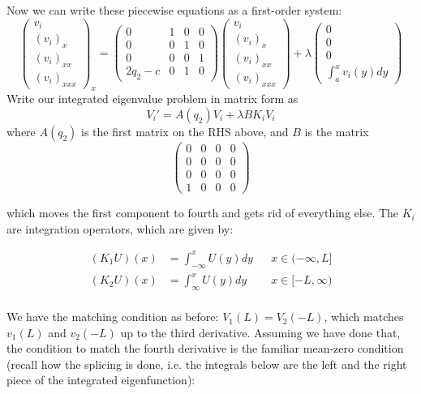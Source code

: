 \documentclass[12pt]{article}
\begin{document}
Now we can write these piecewise equations as a first-order system:
\[
\begin{pmatrix}v_i\\(v_i)_x\\(v_i)_{xx}\\(v_i)_{xxx}\end{pmatrix}_x = 
\begin{pmatrix}0 & 1 & 0 & 0 \\ 0 & 0 & 1 & 0 \\ 0 & 0 & 0 & 1 \\ 2q_2 - c & 0 & 1 & 0\end{pmatrix}
\begin{pmatrix}v_i\\(v_i)_x\\(v_i)_{xx}\\(v_i)_{xxx}\end{pmatrix} + \lambda
\begin{pmatrix}0\\0\\0\\\int_{a}^x v_i(y) dy\end{pmatrix}
\]
Write our integrated eigenvalue problem in matrix form as
\[
V_i' = A(q_2) V_i + \lambda B K_i V_i
\]
where $A(q_2)$ is the first matrix on the RHS above, and $B$ is the matrix
\[
\begin{pmatrix}0 & 0 & 0 & 0 \\0 & 0 & 0 & 0 \\0 & 0 & 0 & 0 \\1 & 0 & 0 & 0 \end{pmatrix}
\]

which moves the first component to fourth and gets rid of everything else. The $K_i$ are integration operators, which are given by:

\begin{align*}
(K_1 U)(x) &= \int_{-\infty}^x U(y) dy && x \in (-\infty, L] \\
(K_2 U)(x) &= \int_{\infty}^x U(y) dy && x \in [-L, \infty) \\
\end{align*}

We have the matching condition as before: $V_1(L) = V_2(-L)$, which matches $v_1(L)$ and $v_2(-L)$ up to the third derivative. Assuming we have done that, the condition to match the fourth derivative is the familiar mean-zero condition (recall how the splicing is done, i.e. the integrals below are the left and the right piece of the integrated eigenfunction):
\end{document}
